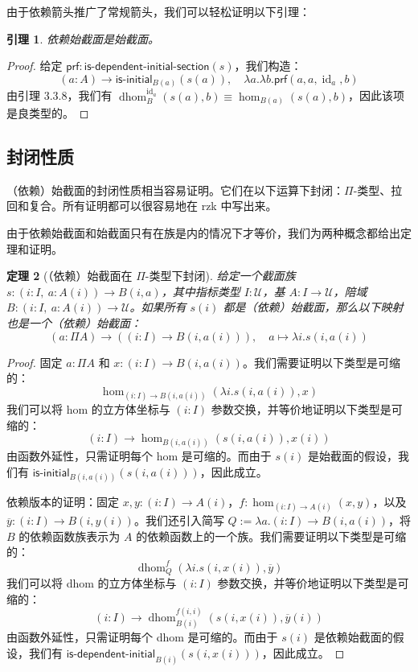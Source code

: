 \documentclass{ctexrep}
\theoremstyle{plain}
\newtheorem{theorem}{定理}[section]
\newtheorem{lemma}[theorem]{引理}
\theoremstyle{definition}
\theoremstyle{remark}
\theoremstyle{definition}
\theoremstyle{definition}
\theoremstyle{definition}
\newcommand{\coloneqq}{\mathrel{:=}}
\newcommand{\id}{\operatorname{id}}
\newcommand{\UU}{\mathcal{U}}
\newcommand{\dhom}{\operatorname{dhom}}
\newcommand{\isinitial}{\mathsf{is\text{-}initial}}
\newcommand{\isdepinitialsection}{\mathsf{is\text{-}dependent\text{-}initial\text{-}section}}
\newcommand{\isdepinitial}{\mathsf{is\text{-}dependent\text{-}initial}}
\begin{document}
由于依赖箭头推广了常规箭头，我们可以轻松证明以下引理：

\begin{lemma}
依赖始截面是始截面。
\end{lemma}

\begin{proof}
给定 $\mathsf{prf}:\isdepinitialsection(s)$，我们构造：
\[
(a:A) \to \isinitial_{B(a)}(s(a)), \quad \lambda a.\lambda b.\mathsf{prf}(a,a,\id_a,b)
\]
由引理 3.3.8，我们有 $\dhom_B^{\id_a}(s(a),b) \equiv \hom_{B(a)}(s(a),b)$，因此该项是良类型的。
\end{proof}

\subsection{封闭性质}

（依赖）始截面的封闭性质相当容易证明。它们在以下运算下封闭：$\Pi$-类型、拉回和复合。所有证明都可以很容易地在 rzk 中写出来。

由于依赖始截面和始截面只有在族是内的情况下才等价，我们为两种概念都给出定理和证明。

\begin{theorem}[（依赖）始截面在 $\Pi$-类型下封闭]
给定一个截面族 $s:(i:I,\ a:A(i)) \to B(i,a)$，其中指标类型 $I:\UU$，基 $A:I\to\UU$，陪域 $B:(i:I,\ a:A(i))\to\UU$。如果所有 $s(i)$ 都是（依赖）始截面，那么以下映射也是一个（依赖）始截面：
\[
(a:\Pi A) \to ((i:I) \to B(i,a(i))), \quad a \mapsto \lambda i.s(i,a(i))
\]
\end{theorem}

\begin{proof}
固定 $a:\Pi A$ 和 $x:(i:I)\to B(i,a(i))$。我们需要证明以下类型是可缩的：
\[
\hom_{(i:I)\to B(i,a(i))}(\lambda i.s(i,a(i)), x)
\]
我们可以将 hom 的立方体坐标与 $(i:I)$ 参数交换，并等价地证明以下类型是可缩的：
\[
(i:I) \to \hom_{B(i,a(i))}(s(i,a(i)), x(i))
\]
由函数外延性，只需证明每个 hom 是可缩的。而由于 $s(i)$ 是始截面的假设，我们有 $\isinitial_{B(i,a(i))}(s(i,a(i)))$，因此成立。

依赖版本的证明：固定 $x,y:(i:I)\to A(i)$，$f:\hom_{(i:I)\to A(i)}(x,y)$，以及 $\overline{y}:(i:I)\to B(i,y(i))$。我们还引入简写 $Q \coloneqq \lambda a.(i:I)\to B(i,a(i))$，将 $B$ 的依赖函数族表示为 $A$ 的依赖函数上的一个族。我们需要证明以下类型是可缩的：
\[
\dhom_Q^f(\lambda i.s(i,x(i)), \overline{y})
\]
我们可以将 dhom 的立方体坐标与 $(i:I)$ 参数交换，并等价地证明以下类型是可缩的：
\[
(i:I) \to \dhom_{B(i)}^{f(i,i)}(s(i,x(i)), \overline{y}(i))
\]
由函数外延性，只需证明每个 dhom 是可缩的。而由于 $s(i)$ 是依赖始截面的假设，我们有 $\isdepinitial_{B(i)}(s(i,x(i)))$，因此成立。
\end{proof}
\end{document}
